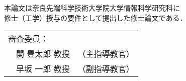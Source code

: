\renewcommand\thepage{Title2}
\thispagestyle{empty}
\vspace*{8cm}
\begin{center}
本論文は奈良先端科学技術大学院大学情報科学研究科に$\ $ \\
修士（工学）授与の要件として提出した修士論文である．

 \bigskip

 \jauthor
 \vspace*{0.4cm}
 \begin{table}[h]
 \begin{center}
	\begin{tabular}[t]{p{}ll}
	 \multicolumn{2}{l}{審査委員：} \\
	 & 関 豊太郎 教授 & （主指導教官） \\
	 & 早坂 一郎 教授 & （副指導教官）
	\end{tabular}
 \end{center}
 \end{table}
 \end{center}
